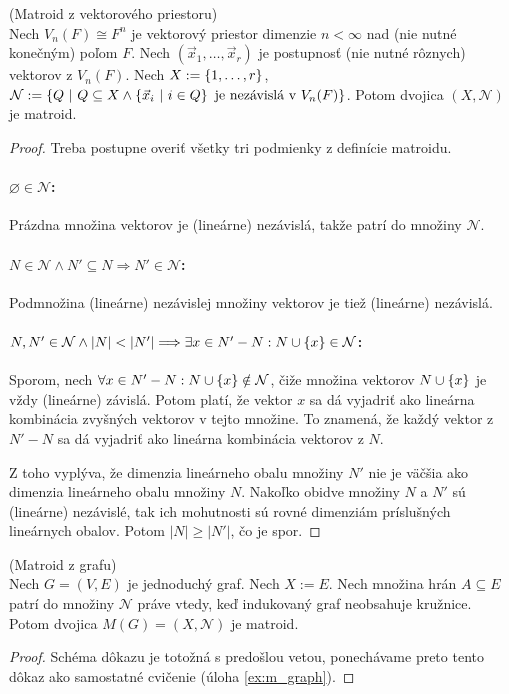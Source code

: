 \begin{theorem}{(Matroid z vektorového priestoru)}\\
Nech $V_n(F) \cong F^n$ je vektorový priestor dimenzie $n < \infty$ nad (nie nutné konečným) poľom $F$.
Nech $(\vec{x}_1, \ldots, \vec{x}_r)$ je postupnosť (nie nutné rôznych) vektorov z $V_n(F)$.
Nech $X := \left\{1, \ldots, r\right\}$, $\mathcal{N} := \left\{Q ~|~ Q \subseteq X \wedge \left\{\vec{x}_i ~|~ i \in Q\right\} \text{ je nezávislá v } V_n(F) \right\}$.
Potom dvojica $(X, \mathcal{N})$ je matroid.
\end{theorem}
\begin{proof}
Treba postupne overiť všetky tri podmienky z definície matroidu.
\paragraph{$\varnothing \in \mathcal{N}$:} Prázdna množina vektorov je (lineárne) nezávislá, takže patrí do množiny $\mathcal{N}$.
\paragraph{$N \in \mathcal{N} \wedge N' \subseteq N \Longrightarrow N' \in \mathcal{N}$:} Podmnožina (lineárne) nezávislej množiny vektorov je tiež (lineárne) nezávislá.
\paragraph{$N, N' \in \mathcal{N} \wedge \left|N\right| < \left|N'\right| \Longrightarrow \exists x \in N' - N: N \cup \left\{x\right\} \in \mathcal{N}$:} 
Sporom, nech $\forall x \in N' - N: N \cup \left\{x\right\} \notin \mathcal{N}$, čiže množina vektorov $N \cup \left\{x\right\}$ je vždy (lineárne) závislá. 
Potom platí, že vektor $x$ sa dá vyjadriť ako lineárna kombinácia zvyšných vektorov v tejto množine.
To znamená, že každý vektor z $N' - N$ sa dá vyjadriť ako lineárna kombinácia vektorov z $N$.

Z toho vyplýva, že dimenzia lineárneho obalu množiny $N'$ nie je väčšia ako dimenzia lineárneho obalu množiny $N$.
Nakoľko obidve množiny $N$ a $N'$ sú (lineárne) nezávislé, tak ich mohutnosti sú rovné dimenziám príslušných lineárnych obalov.
Potom $|N| \geq |N'|$, čo je spor.
\end{proof}

\begin{theorem}{(Matroid z grafu)}\\
\label{th:m_graph}
Nech $G = (V, E)$ je jednoduchý graf. Nech $X := E$. Nech množina hrán $A \subseteq E$ patrí do množiny $\mathcal{N}$ práve vtedy, keď
indukovaný graf neobsahuje kružnice. Potom dvojica $M(G) = (X, \mathcal{N})$ je matroid.
\end{theorem}
\begin{proof}
Schéma dôkazu je totožná s predošlou vetou, ponechávame preto tento dôkaz ako samostatné cvičenie (úloha \ref{ex:m_graph}).
\end{proof}

